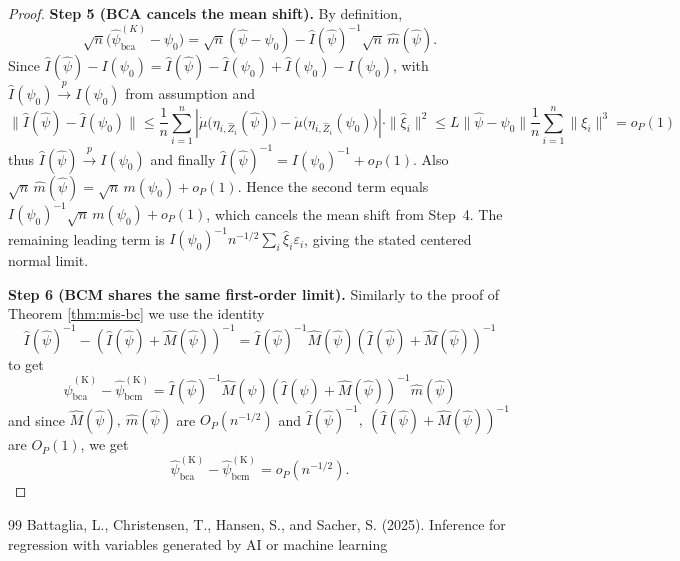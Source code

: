 \documentclass[11pt]{article}
\theoremstyle{definition}
\theoremstyle{remark}
\newcommand{\toP}{\xrightarrow{\,p\,}}
\begin{document}
\begin{proof}
\textbf{Step 5 (BCA cancels the mean shift).}
By definition,
\[
\sqrt{n}\big(\hat\psi_{\mathrm{bca}}^{(K)}-\psi_0\big)
=\sqrt{n}(\hat\psi-\psi_0)-\hat I(\hat\psi)^{-1}\sqrt{n}\,\hat m(\hat\psi).
\]
Since $\hat I (\hat\psi)-I(\psi_0) = \hat I(\hat\psi) - \hat I(\psi_0) + \hat I(\psi_0) - I(\psi_0)$, with $\hat I(\psi_0)\toP I(\psi_0)$ from assumption and 
\[ \|\hat I (\hat\psi) - \hat I(\psi_0)\|\leq \frac{1}{n}\sum_{i=1}^n \left| \dot\mu\big(\eta_{i,\hat Z_i}(\hat\psi)\big) - \dot\mu \big(\eta_{i,\hat Z_i}(\psi_0)\big)\right|\cdot \| \hat\xi_i\|^2 \leq L \|\hat\psi - \psi_0\|\frac{1}{n}\sum_{i=1}^n\| \xi_i\|^3 = o_P(1) \]
thus $\hat I(\hat\psi)\toP I(\psi_0)$ and finally $\hat I(\hat\psi)^{-1}=I(\psi_0)^{-1}+o_P(1)$. Also
$\sqrt{n}\,\hat m(\hat\psi)=\sqrt{n}\,m(\psi_0)+o_P(1)$. Hence the second term equals
$I(\psi_0)^{-1}\sqrt{n}\,m(\psi_0)+o_P(1)$, which cancels the mean shift from Step~4.
The remaining leading term is $I(\psi_0)^{-1}n^{-1/2}\sum_i\hat\xi_i\varepsilon_i$, giving the stated centered normal limit.

\textbf{Step 6 (BCM shares the same first-order limit).} Similarly to the proof of  Theorem \ref{thm:mis-bc} we use the identity
\[ \hat I(\hat\psi)^{-1} - (\hat I(\hat\psi)+\hat M(\hat\psi))^{-1} = \hat I (\hat\psi)^{-1}\hat M(\hat\psi) (\hat I(\hat\psi) + \hat M(\hat\psi))^{-1} \]
to get
\[ \hat\psi^{\mathrm{(K)}}_{\mathrm{bca}} - \hat\psi^{\mathrm{(K)}}_{\mathrm{bcm}} = \hat I (\hat\psi)^{-1}\hat M(\hat\psi) (\hat I(\hat\psi) + \hat M(\hat\psi))^{-1} \hat m (\hat\psi) \]
and since $\hat M(\hat\psi), \ \hat m (\hat\psi)$ are $O_P(n^{-1/2})$ and $\hat I (\hat\psi)^{-1}, \ (\hat I(\hat\psi) + \hat M(\hat\psi))^{-1}$ are $O_P(1)$, we get
\[ \hat\psi^{\mathrm{(K)}}_{\mathrm{bca}} - \hat\psi^{\mathrm{(K)}}_{\mathrm{bcm}} = o_P(n^{-1/2}). \]
\end{proof}

\begin{thebibliography}{99}
Battaglia, L., Christensen, T., Hansen, S., and Sacher, S. (2025).
\newblock Inference for regression with variables generated by AI or machine learning
\end{thebibliography}
\end{document}
